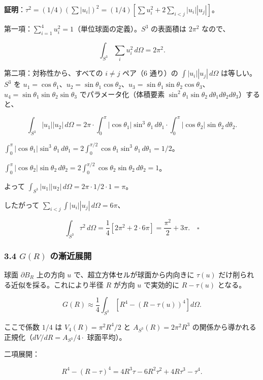 \documentclass[
]{article}
\begin{document}
\textbf{証明}：\(\tau^2 = (1/4)(\sum |u_i|)^2 = (1/4)[\sum u_i^2 + 2\sum_{i<j} |u_i||u_j|]\)。

第一項：\(\sum_{i=1}^4 u_i^2 = 1\)（単位球面の定義）。\(S^3\) の表面積は
\(2\pi^2\) なので、

\[\int_{S^3} \sum_i u_i^2 \, d\Omega = 2\pi^2.\]

第二項：対称性から、すべての \(i \neq j\) ペア（6 通り）の
\(\int |u_i||u_j| \, d\Omega\) は等しい。\(S^3\) を
\(u_1 = \cos\theta_1\)、\(u_2 = \sin\theta_1 \cos\theta_2\)、\(u_3 = \sin\theta_1 \sin\theta_2 \cos\theta_3\)、\(u_4 = \sin\theta_1 \sin\theta_2 \sin\theta_3\)
でパラメータ化（体積要素
\(\sin^2\theta_1 \sin\theta_2 \, d\theta_1 d\theta_2 d\theta_3\)）すると、

\[\int_{S^3} |u_1||u_2| \, d\Omega = 2\pi \cdot \int_0^\pi |\cos\theta_1| \sin^3\theta_1 \, d\theta_1 \cdot \int_0^\pi |\cos\theta_2| \sin\theta_2 \, d\theta_2.\]

\(\int_0^\pi |\cos\theta_1| \sin^3\theta_1 \, d\theta_1 = 2 \int_0^{\pi/2} \cos\theta_1 \sin^3\theta_1 \, d\theta_1 = 1/2\)。

\(\int_0^\pi |\cos\theta_2| \sin\theta_2 \, d\theta_2 = 2 \int_0^{\pi/2} \cos\theta_2 \sin\theta_2 \, d\theta_2 = 1\)。

よって
\(\int_{S^3} |u_1||u_2| \, d\Omega = 2\pi \cdot 1/2 \cdot 1 = \pi\)。

したがって \(\sum_{i<j} \int |u_i||u_j| \, d\Omega = 6\pi\)、

\[\int_{S^3} \tau^2 \, d\Omega = \frac{1}{4}[2\pi^2 + 2 \cdot 6\pi] = \frac{\pi^2}{2} + 3\pi. \quad \square\]

\subsubsection{\texorpdfstring{3.4 \(G(R)\)
の漸近展開}{3.4 G(R) の漸近展開}}\label{gr-ux306eux6f38ux8fd1ux5c55ux958b-1}

球面 \(\partial B_R\) 上の方向 \(u\) で、超立方体セルが球面から内向きに
\(\tau(u)\) だけ削られる近似を採る。これにより半径 \(R\) が方向 \(u\)
で実効的に \(R - \tau(u)\) となる。

\[G(R) \approx \frac{1}{4}\int_{S^3}\left[R^4 - (R - \tau(u))^4\right] d\Omega. \tag{3.3}\]

ここで係数 \(1/4\) は \(V_4(R) = \pi^2 R^4/2\) と
\(A_{S^3}(R) = 2\pi^2 R^3\)
の関係から導かれる正規化（\(dV/dR = A_{S^3}/4 \cdot\) 球面平均）。

二項展開：

\[R^4 - (R - \tau)^4 = 4R^3 \tau - 6R^2 \tau^2 + 4R \tau^3 - \tau^4.\]
\end{document}
